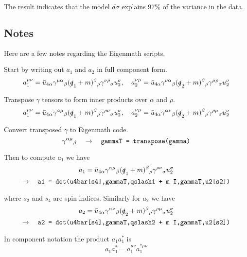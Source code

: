 \documentclass[12pt]{article}
\begin{document}
The result indicates that the model $d\sigma$ explains 97\% of the variance in the data.

\fi

\subsection*{Notes}
Here are a few notes regarding the Eigenmath scripts.

\bigskip
Start by writing out $a_1$ and $a_2$ in full component form.
\begin{equation*}
a_1^{\mu\nu}
=\bar{u}_{4\alpha}\gamma^{\mu\alpha}{}_\beta(\slashed{q}_1+m)^\beta{}_\rho\gamma^{\nu\rho}{}_\sigma u_2^\sigma,
\quad
a_2^{\nu\mu}
=\bar{u}_{4\alpha}\gamma^{\nu\alpha}{}_\beta(\slashed{q}_2+m)^\beta{}_\rho\gamma^{\mu\rho}{}_\sigma u_2^\sigma
\end{equation*}

Transpose $\gamma$ tensors to form inner products over $\alpha$ and $\rho$.
\begin{equation*}
a_1^{\mu\nu}
=\bar{u}_{4\alpha}\gamma^{\alpha\mu}{}_\beta(\slashed{q}_1+m)^\beta{}_\rho\gamma^{\rho\nu}{}_\sigma u_2^\sigma,
\quad
a_2^{\nu\mu}
=\bar{u}_{4\alpha}\gamma^{\alpha\nu}{}_\beta(\slashed{q}_2+m)^\beta{}_\rho\gamma^{\rho\mu}{}_\sigma u_2^\sigma
\end{equation*}

Convert transposed $\gamma$ to Eigenmath code.
\begin{equation*}
\gamma^{\alpha\mu}{}_\beta
\quad\rightarrow\quad
\text{\tt gammaT = transpose(gamma)}
\end{equation*}

Then to compute $a_1$ we have
\begin{multline*}
a_1=\bar{u}_{4\alpha}\gamma^{\alpha\mu}{}_\beta(\slashed{q}_1+m)^\beta{}_\rho\gamma^{\rho\nu}{}_\sigma u_2^\sigma
\\
\rightarrow\quad
\text{\tt a1 = dot(u4bar[s4],gammaT,qslash1 + m I,gammaT,u2[s2])}
\end{multline*}

where $s_2$ and $s_4$ are spin indices.
Similarly for $a_2$ we have
\begin{multline*}
a_2=\bar{u}_{4\alpha}\gamma^{\alpha\nu}{}_\beta(\slashed{q}_2+m)^\beta{}_\rho\gamma^{\rho\mu}{}_\sigma u_2^\sigma
\\
\rightarrow\quad
\text{\tt a2 = dot(u4bar[s4],gammaT,qslash2 + m I,gammaT,u2[s2])}
\end{multline*}

In component notation the product $a_1a_1^*$ is
\begin{equation*}
a_1a_1^*=a_1^{\mu\nu}a_1^{*\mu\nu}
\end{equation*}
\end{document}
